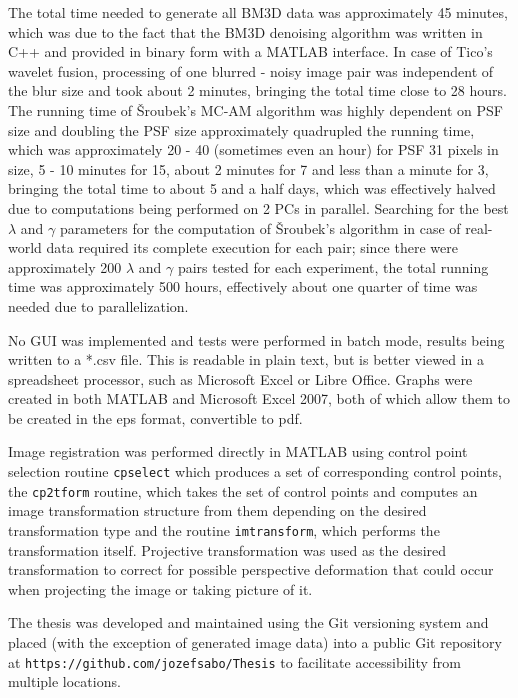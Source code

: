 \documentclass[12pt,notitlepage]{report}
\begin{document}
The total time needed to generate all BM3D data was approximately 45 minutes, which was due to the fact that the BM3D denoising algorithm was written in C++ and provided in binary form with a MATLAB interface. In case of Tico's wavelet fusion, processing of one blurred - noisy image pair was independent of the blur size and took about 2 minutes, bringing the total time close to 28 hours. The running time of Šroubek's MC-AM algorithm was highly dependent on PSF size and doubling the PSF size approximately quadrupled the running time, which was approximately 20 - 40 (sometimes even an hour) for PSF 31 pixels in size, 5 - 10 minutes for 15, about 2 minutes for 7 and less than a minute for 3, bringing the total time to about 5 and a half days, which was effectively halved due to computations being performed on 2 PCs in parallel. Searching for the best $\lambda$ and $\gamma$ parameters for the computation of Šroubek's algorithm in case of real-world data required its complete execution for each pair; since there were approximately 200 $\lambda$ and $\gamma$ pairs tested for each experiment, the total running time was approximately 500 hours, effectively about one quarter of time was needed due to parallelization.  

No GUI was implemented and tests were performed in batch mode, results being written to a *.csv file. This is readable in plain text, but is better viewed in a spreadsheet processor, such as Microsoft Excel or Libre Office. Graphs were created in both MATLAB and Microsoft Excel 2007, both of which allow them to be created in the eps format, convertible to pdf. 

Image registration was performed directly in MATLAB using control point selection routine \texttt{cpselect} which produces a set of corresponding control points, the \texttt{cp2tform} routine, which takes the set of control points and computes an image transformation structure from them depending on the desired transformation type and the routine \texttt{imtransform}, which performs the transformation itself. Projective transformation was used as the desired transformation to correct for possible perspective deformation that could occur when projecting the image or taking picture of it.  

The thesis was developed and maintained using the Git versioning system and placed (with the exception of generated image data) into a public Git repository at \texttt{https://github.com/jozefsabo/Thesis} to facilitate accessibility from multiple locations.
\end{document}
